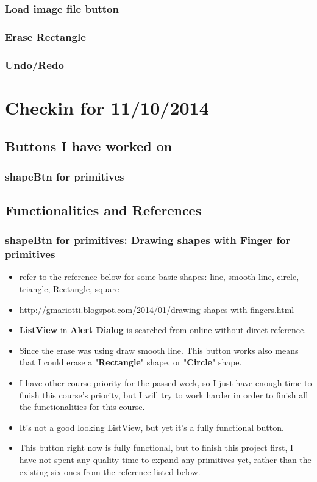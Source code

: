 \documentclass[9pt,b5paper]{article}
\begin{document}
\subsubsection{Load image file button}
\label{sec-2-4-2}
\subsubsection{Erase Rectangle}
\label{sec-2-4-3}
\subsubsection{Undo/Redo}
\label{sec-2-4-4}
\section{Checkin for 11/10/2014}
\label{sec-3}
\subsection{Buttons I have worked on}
\label{sec-3-1}
\subsubsection{shapeBtn for primitives}
\label{sec-3-1-1}

\subsection{Functionalities and References}
\label{sec-3-2}
\subsubsection{shapeBtn for primitives: Drawing shapes with Finger for primitives}
\label{sec-3-2-1}
\begin{itemize}
\item refer to the reference below for some basic shapes: line, smooth line, circle, triangle, Rectangle, square
\item \url{http://gmariotti.blogspot.com/2014/01/drawing-shapes-with-fingers.html}
\item \textbf{ListView} in \textbf{Alert Dialog} is searched from online without direct reference.
\item Since the erase was using draw smooth line. This button works also means that I could erase a "\textbf{Rectangle}" shape, or "\textbf{Circle}" shape.
\item I have other course priority for the passed week, so I just have enough time to finish this course's priority, but I will try to work harder in order to finish all the functionalities for this course.
\item It's not a good looking ListView, but yet it's a fully functional button.
\item This button right now is fully functional, but to finish this project first, I have not spent any quality time to expand any primitives yet, rather than the existing six ones from the reference listed below.
\end{itemize}
\end{document}
